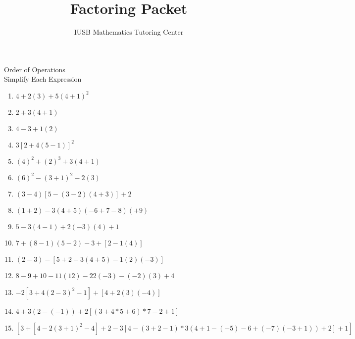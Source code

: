 \documentclass{article}
\title{Factoring Packet}
\date{\mydate}
\author{IUSB Mathematics Tutoring Center}
\begin{document}
\maketitle
\newpage

\underline{Order of Operations}\\
Simplify Each Expression\\
\begin{enumerate}
\item $4+2(3)+5(4+1)^{2}$
\item $2+3(4+1)$
\item $4-3+1(2)$
\item $3[2+4(5-1)]^{2}$
\item $(4)^{2}+(2)^{3}+3(4+1)$
\item $(6)^{2}-(3+1)^{2}-2(3)$
\item $(3-4)[5-(3-2)(4+3)]+2$
\item $(1+2)-3(4+5)(-6+7-8)(+9)$
\item $5-3(4-1)+2(-3)(4)+1$
\item $7+(8-1)(5-2)-3+[2-1(4)]$
\item $(2-3)-[5+2-3(4+5)-1(2)(-3)]$
\item $8-9+10-11(12)-22(-3)-(-2)(3)+4$
\item $-2[3+4(2-3)^{2}-1]+[4+2(3)(-4)]$
\item $4+3(2-(-1))+2[(3+4*5+6)*7-2+1]$
\item $[3+[4-2(3+1)^{2}-4]+2-3[4-(3+2-1)*3(4+1-(-5)-6+(-7)(-3+1))+2]+1]$
\end{enumerate}
\end{document}
